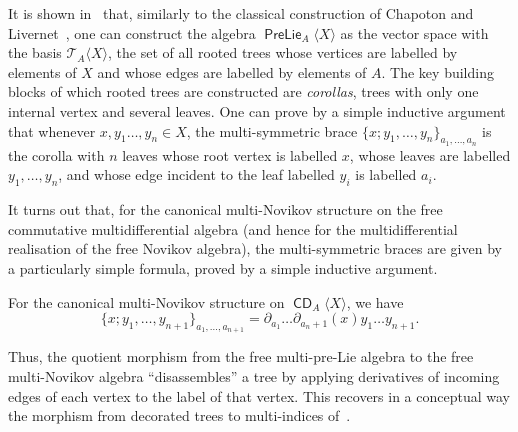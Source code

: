 \documentclass[AHL,Unicode,longabstracts]{cedram}
\newcommand{\RT}{\mathcal{T}}
\DeclareMathOperator{\CDi}{\mathsf{CD}}
\DeclareMathOperator{\PL}{\mathsf{PreLie}}
\begin{document}
It is shown in~\cite{BCCH} that, similarly to the classical construction of Chapoton and Livernet~\cite{ChaLiv}, one can construct the algebra $\PL_A\langle X\rangle$ as the vector space with the basis $\RT_A\langle X\rangle$, the set of all rooted trees whose vertices are labelled by elements of $X$ and whose edges are labelled by elements of $A$. The key building blocks of which rooted trees are constructed are \emph{corollas}, trees with only one internal vertex and several leaves. One can prove by a simple inductive argument that whenever $x,y_1\dots,y_n\in X$, the multi-symmetric brace $\{x;y_1,\dots,y_n\}_{a_1,\dots,a_n}$ is the corolla with $n$ leaves whose root vertex is labelled $x$, whose leaves are labelled $y_1,\dots,y_n$, and whose edge incident to the leaf labelled $y_i$ is labelled $a_i$.

It turns out that, for the canonical multi-Novikov structure on the free commutative multidifferential algebra (and hence for the multidifferential realisation of the free Novikov algebra), the multi-symmetric braces are given by a particularly simple formula, proved by a simple inductive argument.

\begin{prop}\label{brace_Novikov}
For the canonical multi-Novikov structure on $\CDi_A\langle X\rangle$, we have
\[
\{x;y_1,\dots,y_{n+1}\}_{a_1,\dots,a_{n+1}}=\partial_{a_1}\dots\partial_{a_n+1}(x)y_1\dots y_{n+1}.
\]
\end{prop}

Thus, the quotient morphism from the free multi-pre-Lie algebra to the free multi-Novikov algebra ``disassembles'' a tree by applying derivatives of incoming edges of each vertex to the label of that vertex. This recovers in a conceptual way the morphism from decorated trees to multi-indices of~\cite[Remark~5.6]{BK23}.




\end{document}
